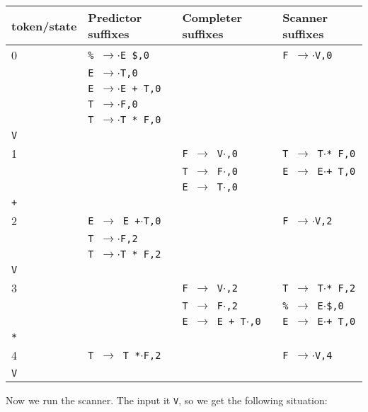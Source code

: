 \documentclass[11pt]{article}
\def\ra{\rightarrow}
\begin{document}
\begin{tabular}{|l|l|l|l|}
\hline
token/state & Predictor suffixes & Completer suffixes & Scanner suffixes\\
\hline
0     & \texttt{\% $\ra$$\cdot$E \$,0} & & \texttt{F $\ra$$\cdot$V,0}\\
      & \texttt{E $\ra$$\cdot$T,0} & & \\
      & \texttt{E $\ra$$\cdot$E + T,0} & & \\
      & \texttt{T $\ra$$\cdot$F,0} & & \\
      & \texttt{T $\ra$$\cdot$T * F,0} & & \\
\hline
\texttt{V} &  & &\\
\hline
1     &  & \texttt{F $\ra$ V$\cdot$,0}& \texttt{T $\ra$ T$\cdot$* F,0} \\
      &  & \texttt{T $\ra$ F$\cdot$,0}& \texttt{E $\ra$ E$\cdot$+ T,0} \\
      &  & \texttt{E $\ra$ T$\cdot$,0}& \\
\hline
\texttt{+} &  & &\\
\hline
2     & \texttt{E $\ra$ E +$\cdot$T,0} & & \texttt{F $\ra$$\cdot$V,2}\\
      & \texttt{T $\ra$$\cdot$F,2} & & \\
      & \texttt{T $\ra$$\cdot$T * F,2} & & \\
\hline 
\texttt{V} & & &\\
\hline
3     &  &  \texttt{F $\ra$ V$\cdot$,2}& \texttt{T $\ra$ T$\cdot$* F,2}\\
      &  &  \texttt{T $\ra$ F$\cdot$,2}& \texttt{\% $\ra$ E$\cdot$\$,0}\\
      &  &  \texttt{E $\ra$ E + T$\cdot$,0}& \texttt{E $\ra$ E$\cdot$+ T,0}\\
\hline
\texttt{*} & & & \\
\hline
4     & \texttt{T $\ra$ T *$\cdot$F,2} & & \texttt{F $\ra$$\cdot$V,4}\\
\hline
\texttt{V} &  & &\\
\hline
\end{tabular}

Now we run the scanner.  The input it \texttt{V}, so we get the
following situation:
\end{document}
